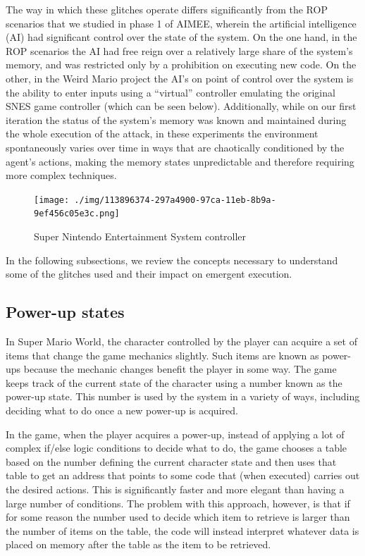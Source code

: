 \documentclass[]{article}
\begin{document}
The way in which these glitches operate differs significantly from the
ROP scenarios that we studied in phase 1 of AIMEE, wherein the
artificial intelligence (AI) had significant control over the state of
the system. On the one hand, in the ROP scenarios the AI had free reign
over a relatively large share of the system's memory, and was restricted
only by a prohibition on executing new code. On the other, in the Weird
Mario project the AI's on point of control over the system is the
ability to enter inputs using a ``virtual'' controller emulating the
original SNES game controller (which can be seen below). Additionally,
while on our first iteration the status of the system's memory was known
and maintained during the whole execution of the attack, in these
experiments the environment spontaneously varies over time in ways that
are chaotically conditioned by the agent's actions, making the memory
states unpredictable and therefore requiring more complex techniques.

\begin{figure}
\centering
\texttt{[image: ./img/113896374-297a4900-97ca-11eb-8b9a-9ef456c05e3c.png]}
\caption{Super Nintendo Entertainment System controller}
\end{figure}

In the following subsections, we review the concepts necessary to
understand some of the glitches used and their impact on emergent
execution.

\hypertarget{power-up-states}{%
\subsection{Power-up states}\label{power-up-states}}

In Super Mario World, the character controlled by the player can acquire
a set of items that change the game mechanics slightly. Such items are
known as power-ups because the mechanic changes benefit the player in
some way. The game keeps track of the current state of the character
using a number known as the power-up state. This number is used by the
system in a variety of ways, including deciding what to do once a new
power-up is acquired.

In the game, when the player acquires a power-up, instead of applying a
lot of complex if/else logic conditions to decide what to do, the game
chooses a table based on the number defining the current character state
and then uses that table to get an address that points to some code that
(when executed) carries out the desired actions. This is significantly
faster and more elegant than having a large number of conditions. The
problem with this approach, however, is that if for some reason the
number used to decide which item to retrieve is larger than the number
of items on the table, the code will instead interpret whatever data is
placed on memory after the table as the item to be retrieved.
\end{document}
